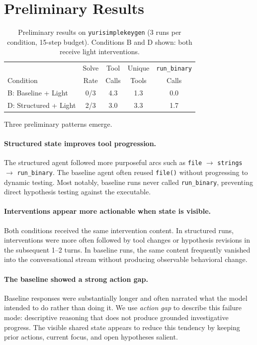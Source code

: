 \documentclass[letterpaper]{article}
\begin{document}
\section{Preliminary Results}

\begin{table}[t]
\centering
\caption{Preliminary results on \texttt{yurisimplekeygen} (3 runs per condition, 15-step budget). Conditions B and D shown: both receive light interventions.}
\label{tab:results}
\begin{tabular}{lcccc}
\toprule
 & Solve & Tool & Unique & \texttt{run\_binary} \\
Condition & Rate & Calls & Tools & Calls \\
\midrule
B: Baseline + Light & 0/3 & 4.3 & 1.3 & 0.0 \\
D: Structured + Light & 2/3 & 3.0 & 3.3 & 1.7 \\
\bottomrule
\end{tabular}
\end{table}

Three preliminary patterns emerge.

\paragraph{Structured state improves tool progression.}
The structured agent followed more purposeful arcs such as \texttt{file} $\rightarrow$ \texttt{strings} $\rightarrow$ \texttt{run\_binary}.
The baseline agent often reused \texttt{file()} without progressing to dynamic testing.
Most notably, baseline runs never called \texttt{run\_binary}, preventing direct hypothesis testing against the executable.

\paragraph{Interventions appear more actionable when state is visible.}
Both conditions received the same intervention content.
In structured runs, interventions were more often followed by tool changes or hypothesis revisions in the subsequent 1--2 turns.
In baseline runs, the same content frequently vanished into the conversational stream without producing observable behavioral change.

\paragraph{The baseline showed a strong action gap.}
Baseline responses were substantially longer and often narrated what the model intended to do rather than doing it.
We use \emph{action gap} to describe this failure mode: descriptive reasoning that does not produce grounded investigative progress.
The visible shared state appears to reduce this tendency by keeping prior actions, current focus, and open hypotheses salient.
\end{document}
